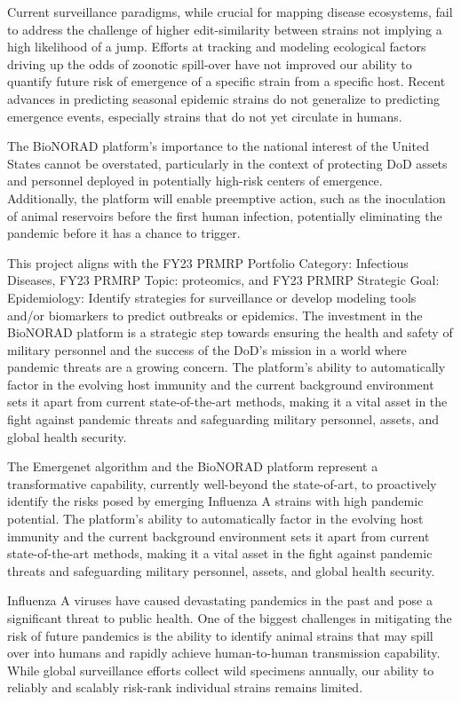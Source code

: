 \documentclass[onecolumn, compsoc,12pt]{IEEEtran}
\begin{document}
Current surveillance paradigms, while crucial for mapping disease ecosystems, fail to address the challenge of higher edit-similarity between strains not implying a high likelihood of a jump. Efforts at tracking and modeling ecological factors driving up the odds of zoonotic spill-over have not improved our ability to quantify future risk of emergence of a specific strain from a specific host. Recent advances in predicting seasonal epidemic strains do not generalize to predicting emergence events, especially strains that do not yet circulate in humans.

The BioNORAD platform’s importance to the national interest of the United States cannot be overstated, particularly in the context of protecting DoD assets and personnel deployed in potentially high-risk centers of emergence. Additionally, the platform will enable preemptive action, such as the inoculation of animal reservoirs before the first human infection, potentially eliminating the pandemic before it has a chance to trigger.

This project aligns with the FY23 PRMRP Portfolio Category: Infectious Diseases, FY23 PRMRP Topic: proteomics, and FY23 PRMRP Strategic Goal: Epidemiology: Identify strategies for surveillance or develop modeling tools and/or biomarkers to predict outbreaks or epidemics. The investment in the BioNORAD platform is a strategic step towards ensuring the health and safety of military personnel and the success of the DoD’s mission in a world where pandemic threats are a growing concern. The platform’s ability to automatically factor in the evolving host immunity and the current background environment sets it apart from current state-of-the-art methods, making it a vital asset in the fight against pandemic threats and safeguarding military personnel, assets, and global health security.

The Emergenet algorithm and the BioNORAD platform represent a transformative capability, currently well-beyond the state-of-art, to proactively identify the risks posed by emerging Influenza A strains with high pandemic potential. The platform's ability to automatically factor in the evolving host immunity and the current background environment sets it apart from current state-of-the-art methods, making it a vital asset in the fight against pandemic threats and safeguarding military personnel, assets, and global health security.




\clearpage


Influenza A viruses have caused devastating pandemics in the past and pose a significant threat to public health. One of the biggest challenges in mitigating the risk of future pandemics is the ability to identify animal strains that may spill over into humans and rapidly achieve human-to-human transmission capability. While global surveillance efforts collect wild specimens annually, our ability to reliably and scalably risk-rank individual strains remains limited.
\end{document}
